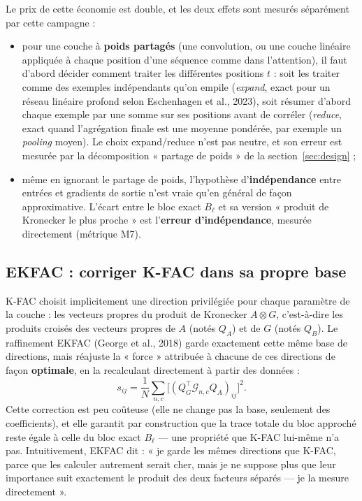 \documentclass[11pt,a4paper]{article}
\newcommand{\eng}[1]{\emph{#1}}
\begin{document}
Le prix de cette économie est double, et les deux effets sont mesurés séparément par cette
campagne :
\begin{itemize}
\item pour une couche à \textbf{poids partagés} (une convolution, ou une couche linéaire appliquée à
chaque position d'une séquence comme dans l'attention), il faut d'abord décider comment traiter les
différentes positions $t$ : soit les traiter comme des exemples indépendants qu'on empile
(\eng{expand}, exact pour un réseau linéaire profond selon Eschenhagen et al., 2023), soit résumer
d'abord chaque exemple par une somme sur ses positions avant de corréler (\eng{reduce}, exact quand
l'agrégation finale est une moyenne pondérée, par exemple un \eng{pooling} moyen). Le choix
expand/reduce n'est pas neutre, et son erreur est mesurée par la décomposition « partage de poids »
de la section~\ref{sec:design} ;
\item même en ignorant le partage de poids, l'hypothèse d'\textbf{indépendance} entre entrées et
gradients de sortie n'est vraie qu'en général de façon approximative. L'écart entre le bloc exact
$B_\ell$ et sa version « produit de Kronecker le plus proche » est l'\textbf{erreur d'indépendance},
mesurée directement (métrique M7).
\end{itemize}

\subsection{EKFAC : corriger K-FAC dans sa propre base}

K-FAC choisit implicitement une direction privilégiée pour chaque paramètre de la couche : les
vecteurs propres du produit de Kronecker $A\otimes G$, c'est-à-dire les produits croisés des
vecteurs propres de $A$ (notés $Q_A$) et de $G$ (notés $Q_B$). Le raffinement EKFAC (George et al.,
2018) garde exactement cette même base de directions, mais réajuste la « force » attribuée à chacune
de ces directions de façon \textbf{optimale}, en la recalculant directement à partir des données :
\[
s_{ij} = \frac1N\sum_{n,c}\Big[(Q_G^\top \mathcal G_{n,c} Q_A)_{ij}\Big]^2 .
\]
Cette correction est peu coûteuse (elle ne change pas la base, seulement des coefficients), et elle
garantit par construction que la trace totale du bloc approché reste égale à celle du bloc exact
$B_\ell$ — une propriété que K-FAC lui-même n'a pas. Intuitivement, EKFAC dit : « je garde les mêmes
directions que K-FAC, parce que les calculer autrement serait cher, mais je ne suppose plus que leur
importance suit exactement le produit des deux facteurs séparés — je la mesure directement ».
\end{document}
